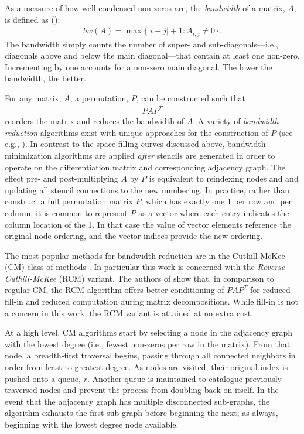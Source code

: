 \documentclass{report}
\begin{document}

As a measure of how well condensed non-zeros are, the \emph{bandwidth} of a matrix, $A$, is defined as (\cite{Cuthill1969, LiuSherman1976}): 
\begin{align}
bw(A) = \max\{|i - j| + 1 : A_{i,j} \neq 0\}.
\end{align}
The bandwidth simply counts the number of super- and sub-diagonals---i.e., diagonals above and below the main diagonal---that contain at least one non-zero. Incrementing by one accounts for a non-zero main diagonal. The lower the bandwidth, the better. 

For any matrix, $A$, a permutation, $P$, can be constructed such that 
\begin{align}
P A P^T
\end{align}
reorders the matrix and reduces the bandwidth of $A$. A variety of \emph{bandwidth reduction} algorithms exist with unique approaches for the construction of $P$ (see e.g., \cite{Gibbs1976, LiuSherman1976, MellorCrummey2001}).  In contrast to the space filling curves discussed above, bandwidth minimization algorithms are applied \emph{after} stencils are generated in order to operate on the differentiation matrix and corresponding adjacency graph. The effect pre- and post-multiplying $A$ by $P$ is equivalent to reindexing nodes and and updating all stencil connections to the new numbering. In practice, rather than construct a full permutation matrix $P$, which has exactly one 1 per row and per column, it is common to represent $P$ as a vector where each entry indicates the column location of the 1. In that case the value of vector elements reference the original node ordering, and the vector indices provide the new ordering. 

The most popular methods for bandwidth reduction are in the Cuthill-McKee (CM) class of methods \cite{Cuthill1969, LiuSherman1976}. In particular this work is concerned with the \emph{Reverse Cuthill-McKee} (RCM) variant. The authors of \cite{LiuSherman1976} show that, in comparison to regular CM, the RCM algorithm offers better conditioning of $PAP^T$ for reduced fill-in and reduced computation during matrix decompositions. While fill-in is not a concern in this work, the RCM variant is attained at no extra cost. 

At a high level, CM algorithms start by selecting a node in the adjacency graph with the lowest degree (i.e., fewest non-zeros per row in the matrix). From that node, a breadth-first traversal begins, passing through all connected neighbors in order from least to greatest degree. As nodes are visited, their original index is pushed onto a queue, $r$. Another queue is maintained to catalogue previously traversed nodes and prevent the process from doubling back on itself. In the event that the adjacency graph has multiple disconnected sub-graphs, the algorithm exhausts the first sub-graph before beginning the next; as always, beginning with the lowest degree node available. 
\end{document}
